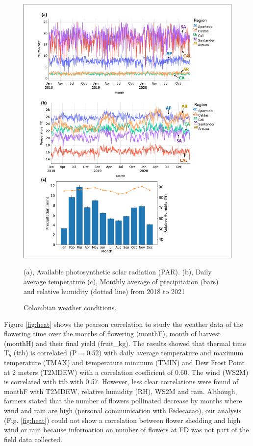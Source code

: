 \documentclass[gene,journal,article,submit,moreauthors,pdftex]{Definitions/mdpi}
\begin{document}
\begin{figure}[h!]
	\centering
	\includegraphics[scale=0.4]{images/clima.png}
	\caption{\footnotesize {Colombian weather conditions. \\}}	
	\label{fig:temp}
	{\footnotesize (a), Available photosynthetic solar radiation (PAR). (b), Daily average temperature  (c), Monthly average of precipitation (bars) and relative humidity (dotted line) from 2018 to 2021 }
\end{figure}
\newpage



Figure \ref{fig:heat} shows the pearson correlation to study the weather data of the flowering time over the months of flowering  (monthF), month of harvest (monthH) and their final yield (fruit\_kg). The results showed that thermal time T$_{b}$ (ttb) is correlated (P = 0.52) with daily average temperature and maximum temperature (TMAX) and  temperature minimum (TMIN) and Dew Frost Point at 2 meters (T2MDEW) with  a correlation coefficient of 0.60. The wind (WS2M) is correlated with ttb with 0.57. However, less clear correlations were found of monthF  with T2MDEW, relative humidity (RH), WS2M and rain. Although, farmers stated that the number of flowers pollinated decrease by months where wind and rain are high (personal communication with Fedecacao), our analysis  (Fig. \ref{fig:heat}) could not show a correlation between flower shedding and high wind or rain because information on number of  flowers at FD was not part of the field data collected. 
\end{document}
